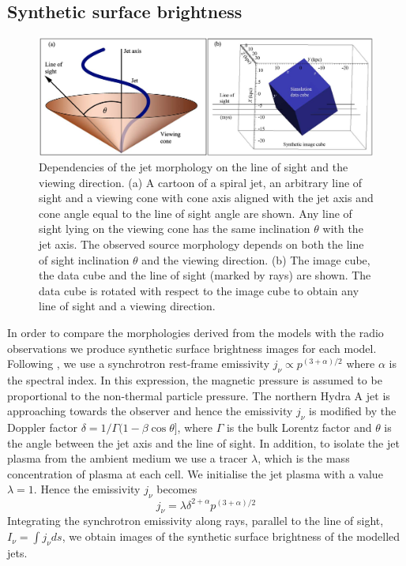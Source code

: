 \documentclass[useAMS, usenatbib]{mn2e}
\begin{document}
\subsection{Synthetic surface brightness}
\begin{figure}
\centering
\includegraphics[width=\textwidth]{fig3.eps}
\caption{Dependencies of the jet morphology on the line of sight and the viewing direction. (a) A cartoon of a spiral jet, an arbitrary line of sight and a viewing cone with cone axis aligned with the jet axis and cone angle equal to the line of sight angle are shown. Any line of sight lying on the viewing cone has the same inclination $\theta$ with the jet axis. The observed source morphology depends on both the line of sight inclination $\theta$ and the viewing direction. (b) The image cube, the data cube and the line of sight (marked by rays) are shown. The data cube is rotated with respect to the image cube to obtain any line of sight and a viewing direction.}
\label{f:con}
\end{figure}

In order to compare the morphologies derived from the models with the radio observations we produce synthetic surface brightness images for each model. Following \citet{sutherland07}, we use a synchrotron rest-frame emissivity $j_\nu \propto p^{(3+\alpha)/2}$ where  $\alpha$ is the spectral index.  In this expression, the magnetic pressure is assumed to be proportional to the non-thermal particle pressure. The northern Hydra A jet is approaching towards the observer and hence the emissivity $j_\nu$ is modified by the Doppler factor $\delta = 1/\Gamma(1 - \beta \cos\theta]$, where $\Gamma$ is the bulk Lorentz factor and $\theta$ is the angle between the jet axis and the line of sight. In addition, to isolate the jet plasma from the ambient medium we use a tracer $\lambda$, which is the mass concentration of plasma at each cell. We initialise the jet plasma with a value $\lambda = 1$. Hence the emissivity $j_\nu$ becomes 
\begin{equation}
j_\nu = \lambda \delta^{2+\alpha}p^{(3+\alpha)/2}
\end{equation}
Integrating the synchrotron emissivity along rays, parallel to the line of sight, $I_\nu = \int j_\nu ds$, we obtain images of the synthetic surface brightness of the modelled jets. 
\end{document}
